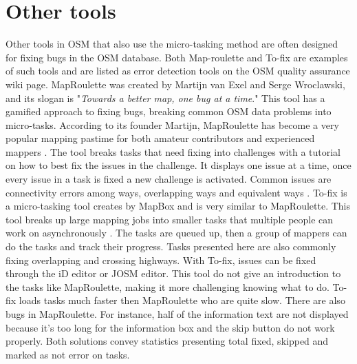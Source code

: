 \section{Other tools}
Other tools in OSM that also use the micro-tasking method are often designed for fixing bugs in the OSM database. Both Map-roulette and To-fix are examples of such tools and are listed as error detection tools on the OSM quality assurance wiki page. MapRoulette was created by Martijn van Exel and Serge Wroclawski, and its slogan is "\textit{Towards a better map, one bug at a time}." This tool has a gamified approach to fixing bugs, breaking common OSM data problems into micro-tasks. According to its founder Martijn, MapRoulette has become a very popular mapping pastime for both amateur contributors and experienced mappers \cite{Exelvan2013}.  The tool breaks tasks that need fixing into challenges with a tutorial on how to best fix the issues in the challenge. It displays one issue at a time, once every issue in a task is fixed a new challenge is activated. Common issues are connectivity errors among ways, overlapping ways and equivalent ways \cite{OpenStreetMapk}. To-fix is a micro-tasking tool creates by MapBox and is very similar to MapRoulette. This tool breaks up large mapping jobs into smaller tasks that multiple people can work on asynchronously \cite{Lidman2014}. The tasks are queued up, then a group of mappers can do the tasks and track their progress. Tasks presented here are also commonly fixing overlapping and crossing highways. With To-fix, issues can be fixed through the iD editor or JOSM editor. This tool do not give an introduction to the tasks like MapRoulette, making it more challenging knowing what to do. To-fix loads tasks much faster then MapRoulette who are quite slow. There are also bugs in MapRoulette. For instance, half of the information text are not displayed because it's too long for the information box and the skip button do not work properly. Both solutions convey statistics presenting total fixed, skipped and marked as not error on tasks. 